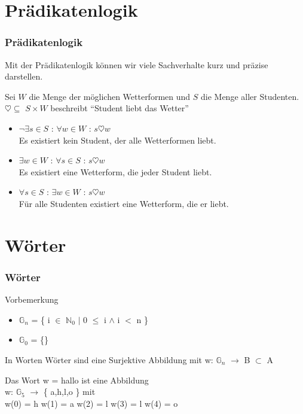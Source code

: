 \documentclass{beamer}
\begin{document}
\section{Prädikatenlogik}
\begin{frame}
	\frametitle{Prädikatenlogik}
	Mit der Prädikatenlogik können wir viele Sachverhalte kurz und präzise 				darstellen.
	\pause
	\begin{block}{}
		Sei $W$ die Menge der möglichen Wetterformen und $S$ die Menge aller 				Studenten.\\
		$\heartsuit \subseteq$ $S \times W$ beschreibt "`Student liebt das 					Wetter"'
		\pause
		\begin{itemize}
			\item $\neg\exists s \in S$ : $\forall w \in W$ : $s \heartsuit w$\\
			\pause
			Es existiert kein Student, der alle Wetterformen liebt.
			\pause
			\item $\exists w \in W$ : $\forall s \in S$ : $s \heartsuit w$\\
			\pause
			Es existiert eine Wetterform, die jeder Student liebt.
			\pause
			\item $\forall s \in S$ : $\exists w \in W$ : $s \heartsuit w$\\
			\pause
			Für alle Studenten existiert eine Wetterform, die er liebt.
		\end{itemize}
	\end{block}
\end{frame}

\section{W\"orter}
\begin{frame}
	\frametitle{Wörter}
	\begin{block}{Vorbemerkung}
		\begin{itemize}
			\item $\mathbb G_n$ = \pause \{ i $ \in $ $\mathbb N_0$ $ | $ 0 $ \le $ i $ \land $ i $ < $ n \}
			\item $\mathbb G_0$ = \pause \{\}
		\end{itemize}
	\end{block}
	\begin{block}{In Worten}
		Wörter sind eine Surjektive Abbildung mit w: $\mathbb G_n$ $\rightarrow$ B $\subset$ A \\
		\begin{example}
			Das Wort w = hallo ist eine Abbildung \\
			w: $\mathbb G_5$ $\rightarrow$ \{ a,h,l,o \} mit \\
			w(0) = h w(1) = a w(2) = l w(3) = l w(4) = o
		\end{example}
	\end{block}
\end{frame}
\end{document}
